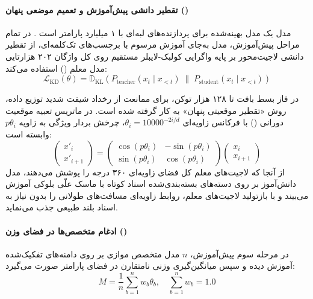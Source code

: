 \item {}

\paragraph*{تقطیر دانشی پیش‌آموزش و تعمیم موضعی پنهان ()}
مدل  یک مدل بهینه‌شده برای پردازنده‌های لبه‌ای با ۱ میلیارد پارامتر است \cite{huber2025mobilellmpro}. در تمام مراحل پیش‌آموزش، مدل به‌جای آموزش مرسوم با برچسب‌های تک‌کلمه‌ای، از تقطیر دانشی لاجیت‌محور بر پایه واگرایی کولبک-لایبلر مستقیم روی کل واژگان ۲۰۲ هزارتایی مدل معلم () استفاده می‌کند:
\begin{equation}
    \mathcal{L}_{\text{KD}}(\theta) = \mathbb{D}_{\text{KL}}\left( P_{\text{teacher}}(x_t \mid x_{<t}) \;\parallel\; P_{\text{student}}(x_t \mid x_{<t}) \right)
\end{equation}

در فاز بسط بافت تا ۱۲۸ هزار توکن، برای ممانعت از رخداد شیفت شدید توزیع داده، روش «تقطیر موقعیتی پنهان» به کار گرفته شده است. در ماتریس تعبیه موقعیت دورانی () با فرکانس زاویه‌ای $\theta_i = 10000^{-2i/d}$، چرخش بردار ویژگی به زاویه $p\theta_i$ وابسته است:
\begin{equation}
    \begin{pmatrix} x'_i \\ x'_{i+1} \end{pmatrix} = \begin{pmatrix} \cos(p\theta_i) & -\sin(p\theta_i) \\ \sin(p\theta_i) & \cos(p\theta_i) \end{pmatrix} \begin{pmatrix} x_i \\ x_{i+1} \end{pmatrix}
\end{equation}
از آنجا که لاجیت‌های معلم کل فضای زاویه‌ای ۳۶۰ درجه را پوشش می‌دهند، مدل دانش‌آموز بر روی دسته‌های بسته‌بندی‌شده اسناد کوتاه با ماسک علّی بلوکی آموزش می‌بیند و با بازتولید لاجیت‌های معلم، روابط زاویه‌ای مسافت‌های طولانی را بدون نیاز به اسناد بلند طبیعی جذب می‌نماید.

\paragraph*{ادغام متخصص‌ها در فضای وزن ()}
در مرحله سوم پیش‌آموزش، $n$ مدل متخصص موازی بر روی دامنه‌های تفکیک‌شده آموزش دیده و سپس میانگین‌گیری وزنی نامتقارن در فضای پارامتر صورت می‌گیرد:
\begin{equation}
    M = \frac{1}{n} \sum_{b=1}^{n} w_b \theta_b, \quad \sum_{b=1}^n w_b = 1.0
\end{equation}


